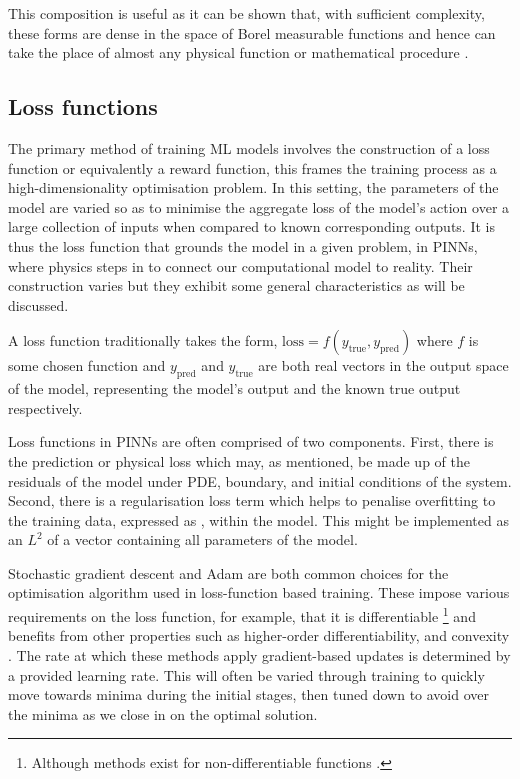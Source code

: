 This composition is useful as it can be shown that, with sufficient complexity, these forms are dense in the space of Borel measurable functions and hence can take the place of almost any physical function or mathematical procedure \cite{hornikMultilayerFeedforwardNetworks1989}.

\subsection{Loss functions}
\label{sec:intro-lf}

The primary method of training ML models involves the construction of a loss function or equivalently a reward function, this frames the training process as a high-dimensionality optimisation problem. In this setting, the parameters of the model are varied so as to minimise the aggregate loss of the model's action over a large collection of inputs when compared to known corresponding outputs. It is thus the loss function that grounds the model in a given problem, in PINNs, where physics steps in to connect our computational model to reality. Their construction varies but they exhibit some general characteristics as will be discussed.

A loss function traditionally takes the form, $\mathrm{loss} = f(y_{\text{true}}, y_{\text{pred}})$ where $f$ is some chosen function and $y_{\text{pred}}$ and $y_{\text{true}}$ are both real vectors in the output space of the model, representing the model's output and the known true output respectively.

Loss functions in PINNs are often comprised of two components. First, there is the prediction or physical loss which may, as mentioned, be made up of the residuals of the model under PDE, boundary, and initial conditions of the system. Second, there is a regularisation loss term which helps to penalise overfitting to the training data, expressed as , within the model. This might be implemented as an $L^2$ of a vector containing all parameters of the model.

Stochastic gradient descent and Adam \cite{kingmaAdamMethodStochastic2017} are both common choices for the optimisation algorithm used in loss-function based training. These impose various requirements on the loss function, for example, that it is differentiable \footnote{Although methods exist for non-differentiable functions \cite{daubechiesIterativeThresholdingAlgorithm2003}.} and benefits from other properties such as higher-order differentiability, and convexity \cite{sraOptimizationMachineLearning2012}. The rate at which these methods apply gradient-based updates is determined by a provided learning rate. This will often be varied through training to quickly move towards minima during the initial stages, then tuned down to avoid  over the minima as we close in on the optimal solution.

